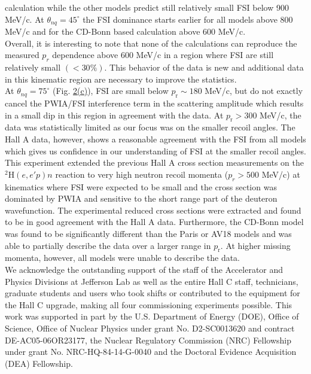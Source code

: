 calculation while the other models predict still relatively small FSI below 900 MeV/c.
At $\theta_{nq}=45^{\circ}$ the FSI dominance starts earlier for all models above 800 MeV/c and for the CD-Bonn based calculation above 600 MeV/c. \\
\indent Overall, it is interesting to note that none of the calculations can reproduce the measured $p_r$ dependence above 600 MeV/c in a region where FSI are still relatively small $(<30\%)$.  This behavior of the data is new
and additional data in this kinematic region are necessary to improve the statistics. \\
\indent At $\theta_{nq}=75^{\circ}$ (Fig. \hyperref[fig:fig2]{2(c)}), FSI are small below $p_{\mathrm{r}}\sim180$ MeV/c, but do not exactly cancel the PWIA/FSI interference term in the scattering amplitude which results in a small dip in this region in agreement with the data.
At $p_{\mathrm{r}}>300$ MeV/c, the data was statistically limited as our focus was on the smaller recoil angles. The Hall A data, however, shows a reasonable agreement with the FSI from all models which gives us confidence in our understanding
of FSI at the smaller recoil angles. \\
\indent This experiment extended the previous Hall A cross section measurements on the $^{2}\mathrm{H}(e,e'p)n$ reaction to 
very high neutron recoil momenta ($p_{r}>500$ MeV/c) at kinematics where FSI were expected to be small and the cross section was dominated by PWIA and sensitive to the
short range part of the deuteron wavefunction. The experimental reduced cross sections were extracted and found to be in good agreement with the Hall A data.
Furthermore, the CD-Bonn model was found to be significantly different than the Paris or AV18 models and was able to partially describe the data over a larger range in $p_{\mathrm{r}}$.
At higher missing momenta, however, all models were unable to describe the data. \\
\indent We acknowledge the outstanding support of the staff of the Accelerator and Physics Divisions at Jefferson Lab
as well as the entire Hall C staff, technicians, graduate students and users who took shifts or contributed
to the equipment for the Hall C upgrade, making all four commissioning experiments possible. This work
was supported in part by the U.S. Department of Energy (DOE), Office of Science, Office of Nuclear Physics
under grant No. D2-SC0013620 and contract DE-AC05-06OR23177, the Nuclear Regulatory Commission (NRC) Fellowship
under grant No. NRC-HQ-84-14-G-0040 and the Doctoral Evidence Acquisition (DEA) Fellowship.

